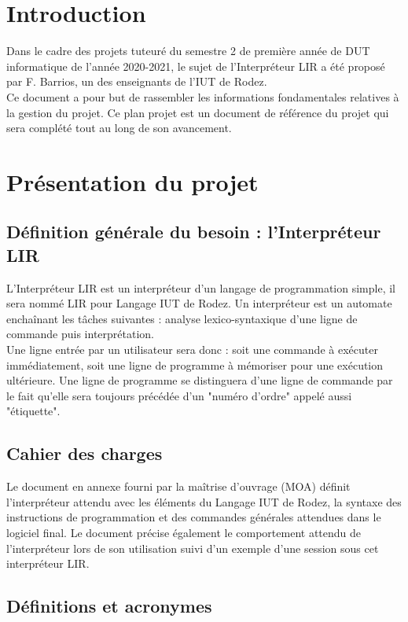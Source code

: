 \documentclass[11pt,a4paper,titlepage,openright]{report}
\begin{document}
    \renewcommand{\contentsname}{Sommaire}
    \tableofcontents

    \chapter*{Introduction}
    \Large
    Dans le cadre des projets tuteuré du semestre 2 de première année de DUT informatique de l’année 2020-2021, le sujet de l’Interpréteur LIR a été proposé par F. Barrios, un des enseignants de l’IUT de Rodez.
    \\Ce document a pour but de rassembler les informations fondamentales relatives à la gestion du projet. Ce plan projet est un document de référence du projet qui sera complété tout au long de son avancement.

    \normalsize
    \chapter{Présentation du projet}
    \section{Définition générale du besoin : l'Interpréteur LIR}
    L’Interpréteur LIR est un interpréteur d’un langage de programmation simple, il sera nommé LIR pour Langage IUT de Rodez.
    Un interpréteur est un automate enchaînant les tâches suivantes : analyse lexico-syntaxique d’une ligne de commande puis interprétation.
    \\Une ligne entrée par un utilisateur sera donc : soit une commande à exécuter immédiatement, soit une ligne de programme à mémoriser pour une exécution ultérieure. Une ligne de programme se distinguera d'une ligne de commande par le fait qu'elle sera toujours précédée d'un "numéro d'ordre" appelé aussi "étiquette".

    \section{Cahier des charges}
    Le document en annexe fourni par la maîtrise d’ouvrage (MOA) définit l’interpréteur attendu avec les éléments du Langage IUT de Rodez, la syntaxe des instructions de programmation et des commandes générales attendues dans le logiciel final. Le document précise également le comportement attendu de l’interpréteur lors de son utilisation suivi d’un exemple d’une session sous cet interpréteur LIR.

    \section{Définitions et acronymes}
\end{document}
